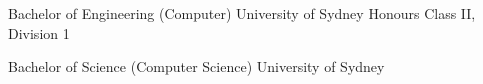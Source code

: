 \begin{education}

{Bachelor of Engineering (Computer)}
{University of Sydney}
{Honours Class II, Division 1}

{Bachelor of Science (Computer Science)}
{University of Sydney}
{}

\end{education}
